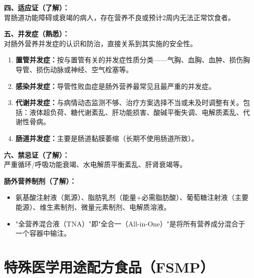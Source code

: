 \begin{tipbox}
\textbf{四、适应证（了解）：}\\
胃肠道功能障碍或衰竭的病人，存在营养不良或预计2周内无法正常饮食者。

\textbf{五、并发症（熟悉）：}\\
对肠外营养并发症的认识和防治，直接关系到其实施的安全性。
\begin{enumerate}[leftmargin=*]
    \item \textbf{置管并发症：}按与置管有关的并发症性质分类——气胸、血胸、血肿、损伤胸导管、损伤动脉或神经、空气栓塞等。
    \item \textbf{感染并发症：}导管性败血症是肠外营养最常见且最严重的并发症。
    \item \textbf{代谢并发症：}与病情动态监测不够、治疗方案选择不当或未及时调整有关。包括：液体超负荷、糖代谢紊乱、肝功能损害、酸碱平衡失调、电解质紊乱、代谢性骨病。
    \item \textbf{肠道并发症：}主要是肠道黏膜萎缩（长期不使用肠道所致）。
\end{enumerate}

\textbf{六、禁忌证（了解）：}\\
严重循环/呼吸功能衰竭、水电解质平衡紊乱、肝肾衰竭等。

\textbf{肠外营养制剂（了解）：}
\begin{itemize}[leftmargin=*]
    \item 氨基酸注射液（氮源）、脂肪乳剂（能量+必需脂肪酸）、葡萄糖注射液（主要能源）、维生素制剂、微量元素制剂、电解质溶液。
    \item "全营养混合液（TNA）"即"全合一（All-in-One）"是将所有营养成分混合于一个容器中输注。
\end{itemize}
\end{tipbox}

\section{特殊医学用途配方食品（FSMP）}

